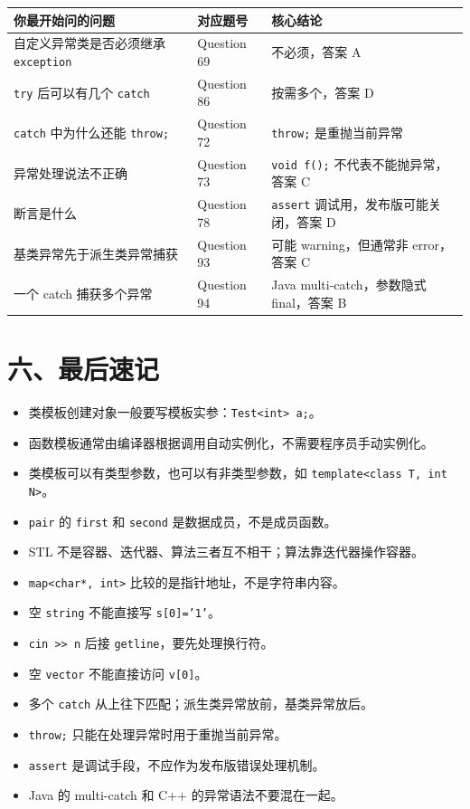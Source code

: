 \documentclass[11pt, a4paper]{article}
\begin{document}
\begin{center}
\begin{tabular}{lll}
\toprule
你最开始问的问题 & 对应题号 & 核心结论 \\
\midrule
自定义异常类是否必须继承 \texttt{exception} & Question 69 & 不必须，答案 A \\
\texttt{try} 后可以有几个 \texttt{catch} & Question 86 & 按需多个，答案 D \\
\texttt{catch} 中为什么还能 \texttt{throw;} & Question 72 & \texttt{throw;} 是重抛当前异常 \\
异常处理说法不正确 & Question 73 & \texttt{void f();} 不代表不能抛异常，答案 C \\
断言是什么 & Question 78 & \texttt{assert} 调试用，发布版可能关闭，答案 D \\
基类异常先于派生类异常捕获 & Question 93 & 可能 warning，但通常非 error，答案 C \\
一个 catch 捕获多个异常 & Question 94 & Java multi-catch，参数隐式 final，答案 B \\
\bottomrule
\end{tabular}
\end{center}

\section*{六、最后速记}

\begin{itemize}
    \item 类模板创建对象一般要写模板实参：\texttt{Test<int> a;}。
    \item 函数模板通常由编译器根据调用自动实例化，不需要程序员手动实例化。
    \item 类模板可以有类型参数，也可以有非类型参数，如 \texttt{template<class T, int N>}。
    \item \texttt{pair} 的 \texttt{first} 和 \texttt{second} 是数据成员，不是成员函数。
    \item STL 不是容器、迭代器、算法三者互不相干；算法靠迭代器操作容器。
    \item \texttt{map<char*, int>} 比较的是指针地址，不是字符串内容。
    \item 空 \texttt{string} 不能直接写 \texttt{s[0]='1'}。
    \item \texttt{cin >> n} 后接 \texttt{getline}，要先处理换行符。
    \item 空 \texttt{vector} 不能直接访问 \texttt{v[0]}。
    \item 多个 \texttt{catch} 从上往下匹配；派生类异常放前，基类异常放后。
    \item \texttt{throw;} 只能在处理异常时用于重抛当前异常。
    \item \texttt{assert} 是调试手段，不应作为发布版错误处理机制。
    \item Java 的 multi-catch 和 C++ 的异常语法不要混在一起。
\end{itemize}
\end{document}
